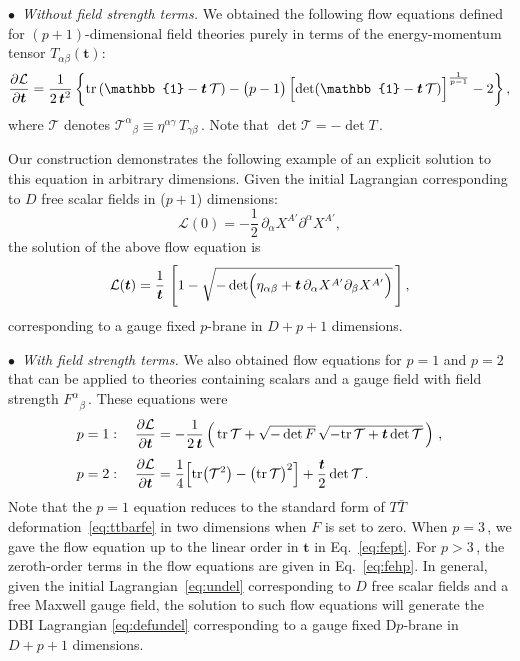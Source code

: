 \documentclass[11pt]{article}
\newcommand{\be}{\begin{equation}}
\newcommand{\ee}{\end{equation}}
\newcommand{\CL}{\mathcal{L}}
\newcommand{\CT}{\mathcal{T}}
\newcommand{\p}{\partial}
\newcommand{\tr}{\text{tr}}
\renewcommand{\emph}[1]{\textit{#1}}
\newcommand{\lambdap}{\boldsymbol{t}}
\begin{document}
\vspace{3mm}

\noindent $\bullet$~\emph{Without field strength terms.} 
We obtained the following flow equations defined for $(p+1)$-dimensional field theories purely in terms of the energy-momentum tensor $T_{\alpha \beta}(\lambdap)$:
%
\be \label{eq:ffe}
    \frac{\p \CL}{\p \lambdap} = \frac{1}{2 \, \lambdap^2} \, \biggl\{ \tr \, (\mathbb{1} - \lambdap\, \CT)  - \bigl(p-1\bigr) \, \Bigl[ \det (\mathbb{1} - \lambdap\, \CT)\Bigr]^{\frac{1}{p-1}} - 2 \biggr\}\,,
\ee
where $\CT$ denotes $\CT^\alpha{}_\beta \equiv \eta^{\alpha \gamma} \, T_{\gamma \beta}$\,. Note that $\det \CT = -\det T$\,.
%

Our construction demonstrates the following example of an explicit solution to this equation in arbitrary dimensions.
Given the initial Lagrangian corresponding to $D$ free scalar fields in ($p+1$) dimensions:
%
\be \label{eq:lzfa}
    \CL(0) = - \frac{1}{2} \, \p_\alpha X^{A'} \p^\alpha X^{A'},
\ee
%
the solution of the above flow equation is
\be \label{eq:lt}
    \mathcal{L} (\lambdap) = \frac{1}{\lambdap} \, \left[
    1  - 
    \sqrt{-\det \Bigl( \eta_{\alpha \beta}  + \lambdap \, \partial_\alpha X^{A'} \partial_\beta X^{A'} \Bigr)}\, \right],
\ee
corresponding to a gauge fixed $p$-brane in $D+p+1$ dimensions.
%



\vspace{3mm}

\noindent $\bullet$~\emph{With field strength terms.} 
We also obtained flow equations for $p=1$ and $p=2$ that can be applied to theories containing scalars and a gauge field with field strength $F^\alpha{}^{}_{\beta}$\,. 
These equations were
%
\begin{subequations}
\label{eq:polfd}
\begin{align}
    p & = 1: 
        \quad%
    \frac{\p \CL}{\p \lambdap}  =- \frac{1}{2 \, \lambdap}  \left( 
       \,\tr \, \CT
        +
        \sqrt{- \det {F}} \, \sqrt{- \tr\,\CT + \lambdap \det \CT}
        \,\right) \,, \\[4pt]
    p & = 2: 
        \quad%
    \frac{\p \CL}{\p \lambdap} = \frac{1}{4} \Bigl[ \tr \bigl( \CT^2 \bigr) - \bigl( \tr \, \CT \bigr)^2 \Bigr] +\frac{\lambdap}{2} \det \CT\,. \label{eq:ptttbfe}
\end{align}
\end{subequations}
%
Note that the $p=1$ equation reduces to the standard form of $T\bar{T}$ deformation~\eqref{eq:ttbarfe} in two dimensions when $F$ is set to zero. When $p = 3$\,, we gave the flow equation up to the linear order in $\lambdap$ in Eq.~\eqref{eq:fept}. For $p > 3$\,, the zeroth-order terms in the flow equations are given in Eq.~\eqref{eq:fehp}. 
In general, given the initial Lagrangian~\eqref{eq:undel} corresponding to $D$ free scalar fields and a free Maxwell gauge field, the solution to such flow equations will generate the DBI Lagrangian \eqref{eq:defundel} corresponding to a gauge fixed D$p$-brane in $D+p+1$ dimensions.
\end{document}
